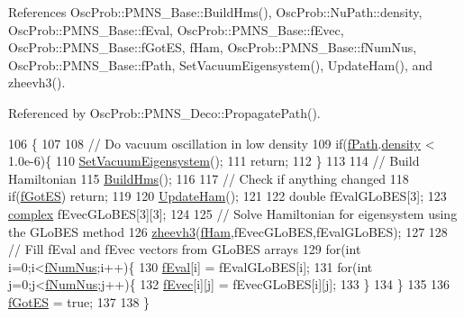 References Osc\+Prob\+::\+P\+M\+N\+S\+\_\+\+Base\+::\+Build\+Hms(), Osc\+Prob\+::\+Nu\+Path\+::density, Osc\+Prob\+::\+P\+M\+N\+S\+\_\+\+Base\+::f\+Eval, Osc\+Prob\+::\+P\+M\+N\+S\+\_\+\+Base\+::f\+Evec, Osc\+Prob\+::\+P\+M\+N\+S\+\_\+\+Base\+::f\+Got\+ES, f\+Ham, Osc\+Prob\+::\+P\+M\+N\+S\+\_\+\+Base\+::f\+Num\+Nus, Osc\+Prob\+::\+P\+M\+N\+S\+\_\+\+Base\+::f\+Path, Set\+Vacuum\+Eigensystem(), Update\+Ham(), and zheevh3().



Referenced by Osc\+Prob\+::\+P\+M\+N\+S\+\_\+\+Deco\+::\+Propagate\+Path().


\begin{DoxyCode}
106 \{
107 
108   \textcolor{comment}{// Do vacuum oscillation in low density}
109   \textcolor{keywordflow}{if}(\hyperlink{classOscProb_1_1PMNS__Base_a849437aa8891fe042e86886ce8f81c6e}{fPath}.\hyperlink{structOscProb_1_1NuPath_a54ddd451db69bc54434de3cf18a117ca}{density} < 1.0e-6)\{
110     \hyperlink{classOscProb_1_1PMNS__Fast_a76dd5a761df8689c502b28ad0391f9e2}{SetVacuumEigensystem}();
111     \textcolor{keywordflow}{return};
112   \}
113 
114   \textcolor{comment}{// Build Hamiltonian}
115   \hyperlink{classOscProb_1_1PMNS__Base_ad0faf5eae755afb1baa1fcd5ffebad41}{BuildHms}();
116 
117   \textcolor{comment}{// Check if anything changed  }
118   \textcolor{keywordflow}{if}(\hyperlink{classOscProb_1_1PMNS__Base_a6dc5cd010d2d70b2324745b4e53e9839}{fGotES}) \textcolor{keywordflow}{return};
119 
120   \hyperlink{classOscProb_1_1PMNS__Fast_a16248082308f9d2c332ebf1be0aa90c3}{UpdateHam}();
121 
122   \textcolor{keywordtype}{double} fEvalGLoBES[3];
123   \hyperlink{classOscProb_1_1PMNS__Base_ae86ec4718808ce9d02e5f5b4226714ab}{complex} fEvecGLoBES[3][3];
124 
125   \textcolor{comment}{// Solve Hamiltonian for eigensystem using the GLoBES method}
126   \hyperlink{zheevh3_8cxx_a96ac4b39a8406951c69eeabad77a3bc6}{zheevh3}(\hyperlink{classOscProb_1_1PMNS__Fast_aab37f2a7f59ab7026a8a21a561115dd0}{fHam},fEvecGLoBES,fEvalGLoBES);
127 
128   \textcolor{comment}{// Fill fEval and fEvec vectors from GLoBES arrays  }
129   \textcolor{keywordflow}{for}(\textcolor{keywordtype}{int} i=0;i<\hyperlink{classOscProb_1_1PMNS__Base_a24bb74bed63569dfe88b18fa6a08060e}{fNumNus};i++)\{
130     \hyperlink{classOscProb_1_1PMNS__Base_a6319c34d7decbb9d7d6da279c06e8c2d}{fEval}[i] = fEvalGLoBES[i];
131     \textcolor{keywordflow}{for}(\textcolor{keywordtype}{int} j=0;j<\hyperlink{classOscProb_1_1PMNS__Base_a24bb74bed63569dfe88b18fa6a08060e}{fNumNus};j++)\{
132       \hyperlink{classOscProb_1_1PMNS__Base_a093e7bd31d4ef52ed52df414e12c1d17}{fEvec}[i][j] = fEvecGLoBES[i][j];
133     \}
134   \}
135   
136   \hyperlink{classOscProb_1_1PMNS__Base_a6dc5cd010d2d70b2324745b4e53e9839}{fGotES} = \textcolor{keyword}{true};
137 
138 \}
\end{DoxyCode}
